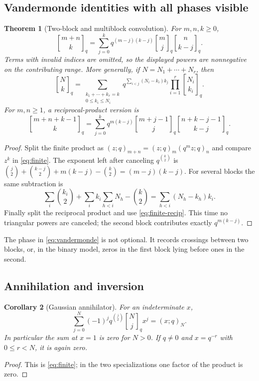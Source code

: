 \documentclass[11pt,a4paper]{article}
\numberwithin{equation}{section}
\newtheorem{theorem}{Theorem}[section]
\newtheorem{corollary}[theorem]{Corollary}
\theoremstyle{definition}
\theoremstyle{remark}
\newcommand{\G}[2]{\genfrac{[}{]}{0pt}{}{#1}{#2}_{q}}
\newcommand{\qp}[2]{(#1;q)_{#2}}
\begin{document}
\subsection{Vandermonde identities with all phases visible}
\begin{theorem}[Two-block and multiblock convolution]
\label{thm:vandermonde}
For $m,n,k\ge0$,
\begin{equation}
 \G{m+n}k
 =\sum_{j=0}^k q^{(m-j)(k-j)}\G mj\G n{k-j}.
 \label{eq:vandermonde}
\end{equation}
Terms with invalid indices are omitted, so the displayed powers are
nonnegative on the contributing range. More generally, if
$N=N_1+\cdots+N_r$, then
\begin{equation}
 \G Nk=
 \sum_{\substack{k_1+\cdots+k_r=k\\0\le k_i\le N_i}}
 q^{\sum_{i<j}(N_i-k_i)k_j}\prod_{i=1}^r\G{N_i}{k_i}.
 \label{eq:multivandermonde}
\end{equation}
For $m,n\ge1$, a reciprocal-product version is
\begin{equation}
 \G{m+n+k-1}k
 =\sum_{j=0}^k q^{m(k-j)}
   \G{m+j-1}j\G{n+k-j-1}{k-j}.
 \label{eq:negative-vandermonde}
\end{equation}
\end{theorem}
\begin{proof}
Split the finite product as
$\qp z{m+n}=\qp zm\qp{q^mz}n$ and compare $z^k$ in
\cref{eq:finite}. The exponent left after canceling
$q^{\binom k2}$ is
$\binom j2+\binom{k-j}2+m(k-j)-\binom k2=(m-j)(k-j)$.
For several blocks the same subtraction is
\[
 \sum_i\binom{k_i}2+
 \sum_i k_i\sum_{h<i}N_h-\binom k2
 =\sum_{h<i}(N_h-k_h)k_i.
\]
Finally split the reciprocal product and use
\cref{eq:finite-recip}. This time no triangular powers are canceled;
the second block contributes exactly $q^{m(k-j)}$.
\end{proof}
The phase in \cref{eq:vandermonde} is not optional. It records crossings
between two blocks, or, in the binary model, zeros in the first block
lying before ones in the second.

\subsection{Annihilation and inversion}
\begin{corollary}[Gaussian annihilator]
\label{cor:annihilator}
For an indeterminate $x$,
\begin{equation}
 \sum_{j=0}^N(-1)^jq^{\binom j2}\G Nj x^j=\qp xN.
 \label{eq:annihilator}
\end{equation}
In particular the sum at $x=1$ is zero for $N>0$. If $q\ne0$ and
$x=q^{-r}$ with $0\le r<N$, it is again zero.
\end{corollary}
\begin{proof}
This is \cref{eq:finite}; in the two specializations one factor of the
product is zero.
\end{proof}
\end{document}
